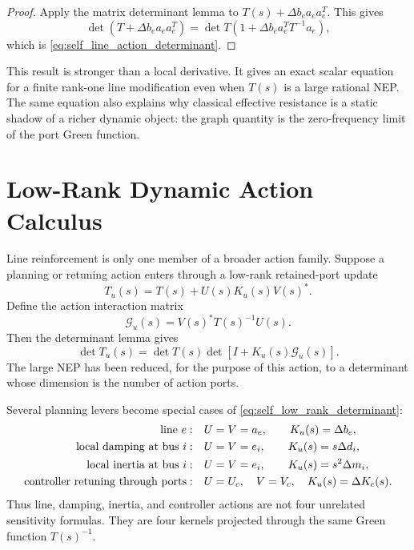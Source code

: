 \begin{proof}
Apply the matrix determinant lemma to
\(T(s)+\Delta b_ea_ea_e^T\). This gives
\[
  \det(T+\Delta b_ea_ea_e^T)
  =
  \det T\left(1+\Delta b_ea_e^TT^{-1}a_e\right),
\]
which is \eqref{eq:self_line_action_determinant}.
\end{proof}

This result is stronger than a local derivative. It gives an exact scalar
equation for a finite rank-one line modification even when \(T(s)\) is a large
rational NEP. The same equation also explains why classical effective
resistance is a static shadow of a richer dynamic object: the graph quantity
is the zero-frequency limit of the port Green function.

\section{Low-Rank Dynamic Action Calculus}

Line reinforcement is only one member of a broader action family. Suppose a
planning or retuning action enters through a low-rank retained-port update
\begin{equation}
  T_u(s)=T(s)+U(s)K_u(s)V(s)^* .
  \label{eq:self_low_rank_action}
\end{equation}
Define the action interaction matrix
\begin{equation}
  \mathcal G_u(s)=V(s)^*T(s)^{-1}U(s).
  \label{eq:self_action_green_matrix}
\end{equation}
Then the determinant lemma gives
\begin{equation}
  \det T_u(s)
  =
  \det T(s)\det\!\left[I+K_u(s)\mathcal G_u(s)\right].
  \label{eq:self_low_rank_determinant}
\end{equation}
The large NEP has been reduced, for the purpose of this action, to a
determinant whose dimension is the number of action ports.

Several planning levers become special cases of
\eqref{eq:self_low_rank_determinant}:
\begin{align}
  \hbox{line } e:\quad
  &U=V=a_e,\qquad K_u(s)=\Delta b_e, \label{eq:self_action_line}\\
  \hbox{local damping at bus } i:\quad
  &U=V=e_i,\qquad K_u(s)=s\Delta d_i, \label{eq:self_action_damping}\\
  \hbox{local inertia at bus } i:\quad
  &U=V=e_i,\qquad K_u(s)=s^2\Delta m_i, \label{eq:self_action_inertia}\\
  \hbox{controller retuning through ports}:\quad
  &U=U_c,\quad V=V_c,\quad K_u(s)=\Delta K_c(s).
  \label{eq:self_action_controller}
\end{align}
Thus line, damping, inertia, and controller actions are not four unrelated
sensitivity formulas. They are four kernels projected through the same Green
function \(T(s)^{-1}\).

